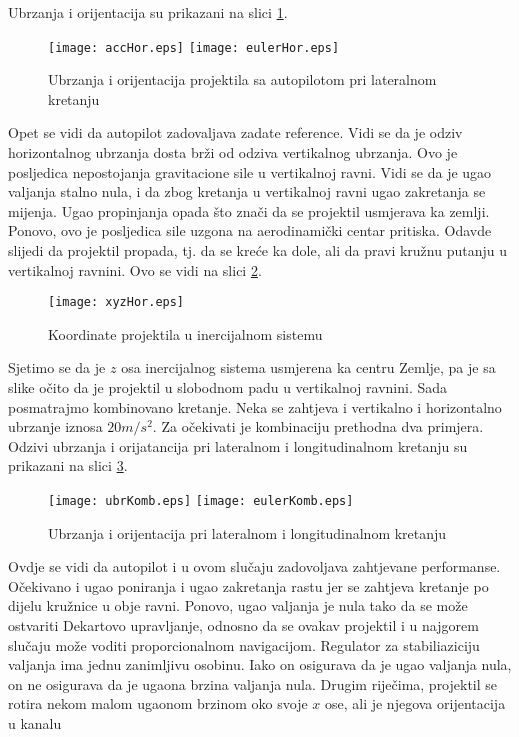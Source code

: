 Ubrzanja i orijentacija su prikazani na slici \ref{fig:horOdziv}.
\begin{figure}[!ht]
    \centering
    \texttt{[image: accHor.eps]}
    \texttt{[image: eulerHor.eps]}
    \caption{Ubrzanja i orijentacija projektila sa autopilotom pri lateralnom kretanju}
    \label{fig:horOdziv}
\end{figure}
Opet se vidi da autopilot zadovaljava zadate reference. Vidi se da je odziv horizontalnog 
ubrzanja dosta brži od odziva vertikalnog ubrzanja. Ovo je posljedica nepostojanja 
gravitacione sile u vertikalnoj ravni. Vidi se da je ugao valjanja stalno nula, i da zbog 
kretanja u vertikalnoj ravni ugao zakretanja se mijenja. Ugao propinjanja opada što 
znači da se projektil usmjerava ka zemlji. Ponovo, ovo je posljedica sile uzgona na 
aerodinamički centar pritiska. Odavde slijedi da projektil propada, tj. da se kreće ka dole, ali da pravi 
kružnu putanju u vertikalnoj ravnini. Ovo se vidi na slici \ref{fig:horxyz}.
\begin{figure}[!ht]
    \centering 
    \texttt{[image: xyzHor.eps]}
    \caption{Koordinate projektila u inercijalnom sistemu }
    \label{fig:horxyz}
\end{figure}
Sjetimo se da je $z$ osa inercijalnog sistema usmjerena ka centru Zemlje, pa je sa slike očito da 
je projektil u slobodnom padu u vertikalnoj ravnini. 
Sada posmatrajmo kombinovano kretanje. Neka se zahtjeva i vertikalno i horizontalno 
ubrzanje iznosa $20m/s^2$. Za očekivati je kombinaciju prethodna dva primjera. 
Odzivi ubrzanja i orijatancija pri lateralnom i longitudinalnom kretanju su prikazani na slici \ref{fig:kombinovano}.
\begin{figure}[!ht]
    \centering
    \texttt{[image: ubrKomb.eps]}
    \texttt{[image: eulerKomb.eps]}
    \caption{Ubrzanja i orijentacija pri lateralnom i longitudinalnom kretanju}
    \label{fig:kombinovano}
\end{figure}
Ovdje se vidi da autopilot i u ovom slučaju zadovoljava zahtjevane performanse. Očekivano i 
ugao poniranja i ugao zakretanja rastu jer se zahtjeva kretanje po dijelu kružnice u obje ravni. 
Ponovo, ugao valjanja je nula tako da se može ostvariti Dekartovo upravljanje, odnosno da 
se ovakav projektil i u najgorem slučaju može voditi proporcionalnom navigacijom.
Regulator za stabiliaziciju valjanja ima jednu zanimljivu osobinu. Iako on osigurava 
da je ugao valjanja nula, on ne osigurava da je ugaona brzina valjanja nula. Drugim riječima, 
projektil se rotira nekom malom ugaonom brzinom oko svoje $x$ ose, ali je njegova orijentacija u kanalu 
